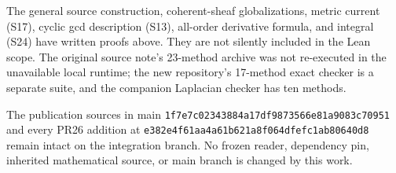 The general source construction, coherent-sheaf globalizations, metric current (S17), cyclic gcd description (S13), all-order derivative formula, and integral (S24) have written proofs above. They are not silently included in the Lean scope. The original source note's 23-method archive was not re-executed in the unavailable local runtime; the new repository's 17-method exact checker is a separate suite, and the companion Laplacian checker has ten methods.

The publication sources in main \texttt{1f7e7c02343884a17df9873566e81a9083c70951} and every PR26 addition at \texttt{e382e4f61aa4a61b621a8f064dfefc1ab80640d8} remain intact on the integration branch. No frozen reader, dependency pin, inherited mathematical source, or main branch is changed by this work.
